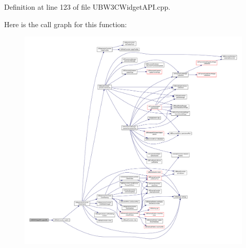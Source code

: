 Definition at line 123 of file U\-B\-W3\-C\-Widget\-A\-P\-I.\-cpp.



Here is the call graph for this function\-:
\nopagebreak
\begin{figure}[H]
\begin{center}
\leavevmode
\includegraphics[width=350pt]{da/d8c/class_u_b_w3_c_widget_a_p_i_a3ae232b04234dfa844228a9ff34b98bb_cgraph}
\end{center}
\end{figure}


